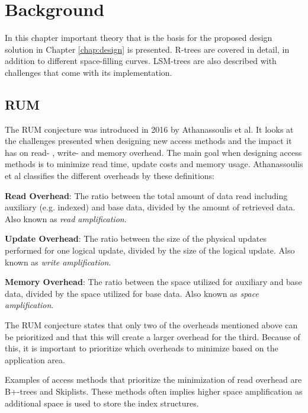 \chapter{Background}
\label{chap:background}

In this chapter important theory that is the basis for the proposed design solution in Chapter \ref{chap:design} is presented. R-trees are covered in detail, in addition to different space-filling curves. LSM-trees are also described with challenges that come with its implementation. 

\section{RUM}
The RUM conjecture was introduced in 2016 by Athanassoulis et al\cite{RUM}. It looks at the challenges presented when designing new access methods and the impact it has on read- , write- and memory overhead. The main goal when designing access methods is to minimize read time, update costs and memory usage. Athanassoulis et al classifies the different overheads by these definitions: \newline

\noindent
\textbf{Read Overhead}: The ratio between the total amount of data read including auxiliary (e.g. indexed) and base data, divided by the amount of retrieved data. Also known as \emph{read amplification}.\newline

\noindent
\textbf{Update Overhead}: The ratio between the size of the physical updates performed for one logical update, divided by the size of the logical update. Also known as \emph{write amplification}.\newline

\noindent
\textbf{Memory Overhead}: The ratio between the space utilized for auxiliary and base data, divided by the space utilized for base data. Also known as \emph{space amplification}. \newline

\noindent
The RUM conjecture states that only two of the overheads mentioned above can be prioritized and that this will create a larger overhead for the third. Because of this, it is important to prioritize which overheads to minimize based on the application area. \newline

\noindent
Examples of access methods that prioritize the minimization of read overhead are B+-trees and Skiplists. These methods often implies higher space amplification as additional space is used to store the index structures. \newline

